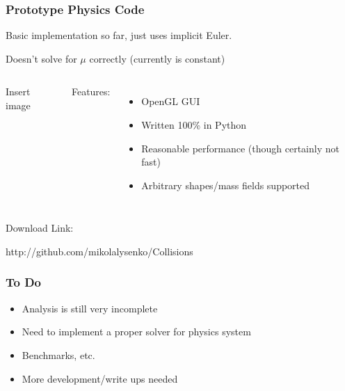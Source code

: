 \documentclass{beamer}
\begin{document}
\begin{frame}
\frametitle{Prototype Physics Code}

Basic implementation so far, just uses implicit Euler.

\hskip10pt Doesn't solve for $\mu$ correctly (currently is constant)

\vskip15pt
\begin{columns}

		Insert image
		
		Features:
		\begin{itemize}
			\item OpenGL GUI
			\item Written 100\% in Python
			\item Reasonable performance (though certainly not fast)
			\item Arbitrary shapes/mass fields supported
		\end{itemize}
\end{columns}

\vskip15pt
Download Link:
\begin{center}
http://github.com/mikolalysenko/Collisions
\end{center}
\end{frame}

\begin{frame}
\frametitle{To Do}
\begin{itemize}
\item Analysis is still very incomplete
\item Need to implement a proper solver for physics system
\item Benchmarks, etc.
\item More development/write ups needed
\end{itemize}
\end{frame}
\end{document}
